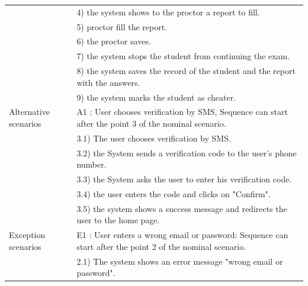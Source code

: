 \documentclass[]{uc2pfecaneva}
\begin{document}
\begin{table}[h]
\begin{tabularx}{\textwidth}{|l|X|}
            & 4) the system shows to the proctor a report to fill.                                                                   \\
            & 5) proctor fill the report.                                                                                            \\
            & 6) the proctor saves.                                                                                                  \\
            & 7) the system stops the student from continuing the exam.                                                              \\
            & 8) the system saves the record of the student and the report with the answers.                                         \\
            & 9) the system marks the student as cheater.                                                                            \\ \hline
            Alternative scenarios
            & A1 : User chooses verification by SMS,  Sequence can start after the point 3 of the nominal scenario.                  \\
            & \hspace{4mm}3.1) The user chooses verification by SMS.                                                                 \\
            & \hspace{4mm}3.2) the System sends a verification code to the user's phone number.                                      \\
            & \hspace{4mm}3.3) the System asks the user to enter his verification code.                                              \\
            & \hspace{4mm}3.4) the user enters the code and clicks on "Confirm".                                                     \\
            & \hspace{4mm}3.5) the system shows a success message and redirects the user to the home page.                           \\ \hline
            Exception scenarios
            & E1 : User enters a wrong email or password: Sequence can start after the point 2 of the nominal scenario.              \\
            & \hspace{4mm}2.1) The system shows an error message "wrong email or password".                                          \\

\end{tabularx}
\end{table}
\end{document}
